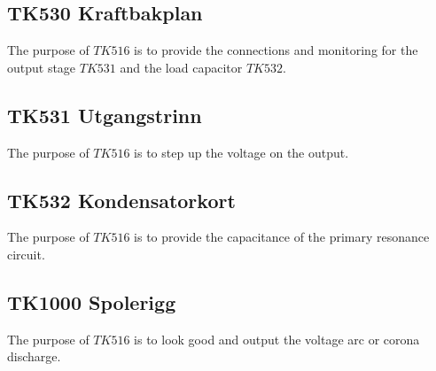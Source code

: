 \subsection*{TK530 Kraftbakplan}
The purpose of $TK516$ is to provide the connections and monitoring for the output stage $TK531$ and the load capacitor $TK532$.

\subsection*{TK531 Utgangstrinn}
The purpose of $TK516$ is to step up the voltage on the output.

\subsection*{TK532 Kondensatorkort}
The purpose of $TK516$ is to provide the capacitance of the primary resonance circuit.

\subsection{TK1000 Spolerigg}
The purpose of $TK516$ is to look good and output the voltage arc or corona discharge.